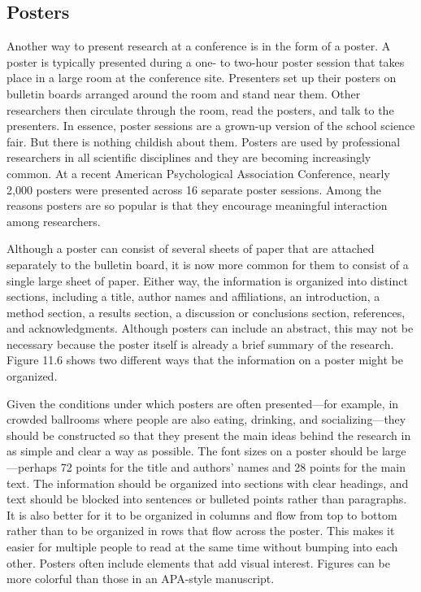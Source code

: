 \subsection{Posters}

Another way to present research at a conference is in the form of a poster. A poster is typically presented during a one- to two-hour poster session that takes place in a large room at the conference site. Presenters set up their posters on bulletin boards arranged around the room and stand near them. Other researchers then circulate through the room, read the posters, and talk to the presenters. In essence, poster sessions are a grown-up version of the school science fair. But there is nothing childish about them. Posters are used by professional researchers in all scientific disciplines and they are becoming increasingly common. At a recent American Psychological Association Conference, nearly 2,000 posters were presented across 16 separate poster sessions. Among the reasons posters are so popular is that they encourage meaningful interaction among researchers.

Although a poster can consist of several sheets of paper that are attached separately to the bulletin board, it is now more common for them to consist of a single large sheet of paper. Either way, the information is organized into distinct sections, including a title, author names and affiliations, an introduction, a method section, a results section, a discussion or conclusions section, references, and acknowledgments. Although posters can include an abstract, this may not be necessary because the poster itself is already a brief summary of the research. Figure 11.6 shows two different ways that the information on a poster might be organized.

Given the conditions under which posters are often presented---for example, in crowded ballrooms where people are also eating, drinking, and socializing---they should be constructed so that they present the main ideas behind the research in as simple and clear a way as possible. The font sizes on a poster should be large---perhaps 72 points for the title and authors' names and 28 points for the main text. The information should be organized into sections with clear headings, and text should be blocked into sentences or bulleted points rather than paragraphs. It is also better for it to be organized in columns and flow from top to bottom rather than to be organized in rows that flow across the poster. This makes it easier for multiple people to read at the same time without bumping into each other. Posters often include elements that add visual interest. Figures can be more colorful than those in an APA-style manuscript.

